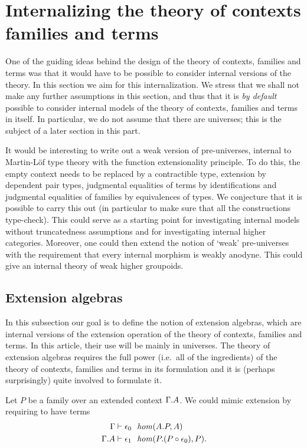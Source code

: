 \section{Internalizing the theory of contexts families and terms}
One of the guiding ideas behind the design of the theory of contexts, families
and terms was that it would have to be possible to consider internal versions
of the theory. In this section we aim for this internalization. We stress that
we shall not make any further assumptions in this section, and thus that
it is \emph{by default} possible to consider internal models of the theory
of contexts, families and terms in itself. In particular, we do not assume that
there are universes; this is the subject of a later section in this part.

It would be interesting to write out a weak version of pre-universes, internal
to Martin-L\"of type theory with the function extensionality principle. 
To do this, the empty context needs to
be replaced by a contractible type, extension by dependent pair types,
judgmental equalities of terms by identifications and judgmental equalities
of families by equivalences of types. We conjecture that it is possible to
carry this out (in particular to make sure that all the constructions 
type-check). This could serve as a starting point for investigating internal
models without truncatedness assumptions and for investigating internal higher
categories. 
Moreover, one could then extend the notion of `weak' pre-universes
with the requirement that every internal morphism is weakly anodyne. This
could give an internal theory of weak higher groupoids.

\subsection{Extension algebras}
In this subsection our goal is to define the notion of extension algebras,
which are internal versions of the extension operation of the theory of
contexts, families and terms. In this article, their use will be mainly in
universes. The theory of extension algebras requires the full power (i.e.~all
of the ingredients) of the theory of contexts, families and terms in its
formulation and it is (perhaps surprisingly) quite involved to formulate it.

Let $P$ be a family over an extended context $\ctxext{\Gamma}{A}$. We could
mimic extension by requiring to have terms
\begin{align*}
\jhom*{\Gamma}{{A}{P}}{A}{\epsilon_0}\\
\jhom*{{\Gamma}{A}}{{P}{\jcomp{}{\epsilon_0}{P}}}{P}{\epsilon_1}.
\end{align*}

